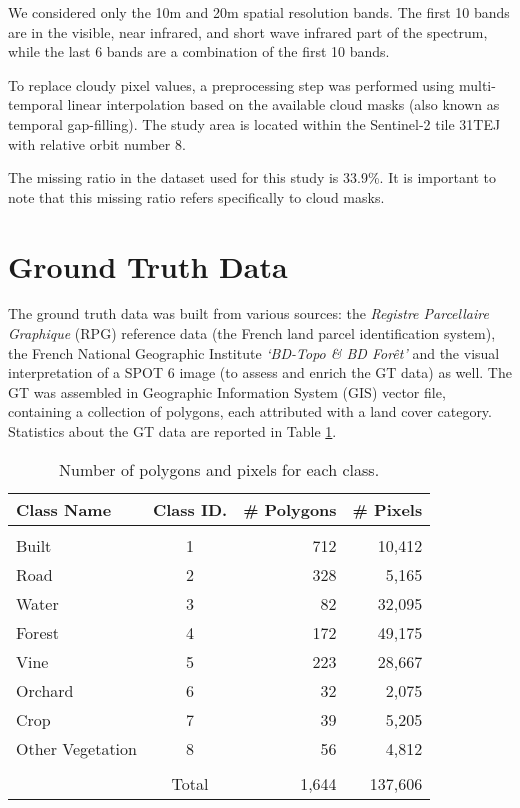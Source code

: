 We considered only the 10m and 20m spatial resolution bands. The first 10 bands are in the visible, near infrared, and short wave infrared part of the spectrum, while the last 6 bands are a combination of the first 10 bands.

To replace cloudy pixel values, a preprocessing step was performed using multi-temporal linear interpolation based on the available cloud masks (also known as temporal gap-filling\cite{IENCO201911}).
The study area is located within the Sentinel-2 tile 31TEJ with relative orbit number 8.

The missing ratio in the dataset used for this study is 33.9\%. It is important to note that this missing ratio refers specifically to cloud masks.

\section{Ground Truth Data}

The ground truth data was built from various sources: the \textit{Registre Parcellaire Graphique} (RPG) reference data (the French land parcel identification system), the French National Geographic Institute \textit{‘BD-Topo \& BD Forêt’} and the visual interpretation of a SPOT 6 image (to assess and enrich the GT data) as well. 
The GT was assembled in Geographic Information System (GIS) vector file, containing a collection of polygons, each attributed with a land cover category. 
Statistics about the GT data are reported in Table \ref{tab:gt}.

\begin{table}[H]
\centering
\begin{tabular}{lcrr}
  Class Name & Class ID. & \# Polygons & \# Pixels \\[0.2cm]\hline \\[-0.2cm] 
  Built & 1 & 712 & 10,412\\
  Road  & 2 & 328 & 5,165\\
  Water & 3 & 82 & 32,095\\
  Forest  & 4 & 172 & 49,175\\
  Vine  & 5 & 223 & 28,667\\
  Orchard & 6 & 32 & 2,075\\
  Crop  & 7 & 39 & 5,205\\
  Other Vegetation & 8  & 56 & 4,812 \\[0.2cm]\hline \\[-0.2cm] 
  & Total & 1,644 & 137,606
\end{tabular}
\caption{Number of polygons and pixels for each class.}
\label{tab:gt}
\end{table}


